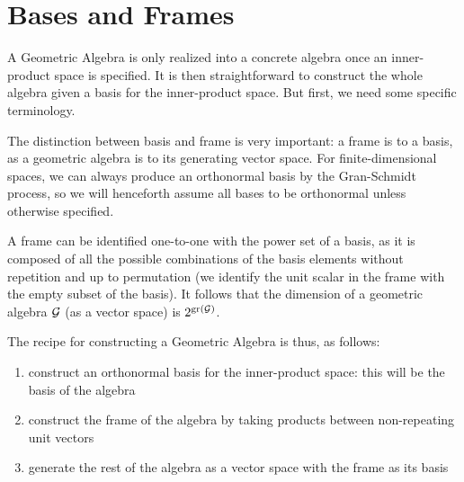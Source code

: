 \section{Bases and Frames}

A Geometric Algebra is only realized into a concrete algebra once an inner-product space is specified. It is then straightforward to construct the whole algebra given a basis for the inner-product space. But first, we need some specific terminology.





The distinction between basis and frame is very important: a frame is to a basis, as a geometric algebra is to its generating vector space.
For finite-dimensional spaces, we can always produce an orthonormal basis by the Gran-Schmidt process, so we will henceforth assume all bases to be orthonormal unless otherwise specified.

A frame can be identified one-to-one with the power set of a basis, as it is composed of all the possible combinations of the basis elements without repetition and up to permutation (we identify the unit scalar in the frame with the empty subset of the basis). It follows that the dimension of a geometric algebra $\mathcal{G}$ (as a vector space) is $2^{\mathrm{gr}\left(\mathcal{G}\right)}$.

The recipe for constructing a Geometric Algebra is thus, as follows:
\begin{enumerate}
	\item construct an orthonormal basis for the inner-product space: this will be the basis of the algebra
	\item construct the frame of the algebra by taking products between non-repeating unit vectors
	\item generate the rest of the algebra as a vector space with the frame as its basis
\end{enumerate}

% 
% 
